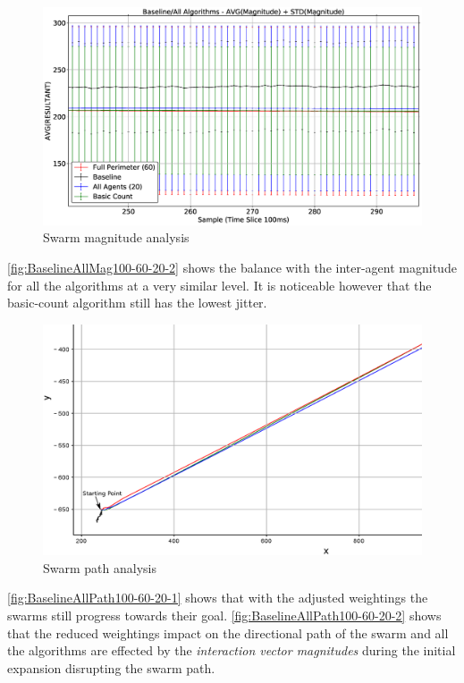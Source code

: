 \begin{figure}[H]
\begin{center}
\includegraphics[width=14cm]{CHAPTER-6/figures/BaselineAllMag100-60-20-2}
\end{center}
\caption{Swarm magnitude analysis\label{fig:BaselineAllMag100-60-20-2}}
\end{figure}

\autoref{fig:BaselineAllMag100-60-20-2} shows the balance with the inter-agent magnitude for all the algorithms at a very similar level. It is noticeable however that the basic-count algorithm still has the lowest jitter.

\begin{figure}[H]
\begin{center}
\includegraphics[width=14cm]{CHAPTER-6/figures/BaselineAllPath100-60-20-1}
\end{center}
\caption{Swarm path analysis\label{fig:BaselineAllPath100-60-20-1}}
\end{figure}

\autoref{fig:BaselineAllPath100-60-20-1} shows that with the adjusted weightings the swarms still progress towards their goal. \autoref{fig:BaselineAllPath100-60-20-2} shows that the reduced weightings impact on the directional path of the swarm and all the algorithms are effected by the \textit{interaction vector magnitudes} during the initial expansion disrupting the swarm path.

